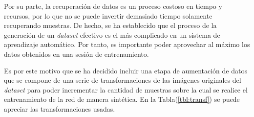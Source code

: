     Por su parte, la recuperación de datos es un proceso costoso en tiempo y recursos, por lo que no se puede invertir demasiado 
    tiempo solamente recuperando muestras. De hecho, se ha establecido que el proceso de la generación de un \textit{dataset} efectivo 
    es el más complicado en un sistema de aprendizaje automático. Por tanto, es importante poder aprovechar al máximo los datos 
    obtenidos en una sesión de entrenamiento.

    Es por este motivo que se ha decidido incluir una etapa de aumentación de datos que se compone de una serie de transformaciones 
    de las imágenes originales del \textit{dataset} para poder incrementar la cantidad de muestras sobre la cual se realice el 
    entrenamiento de la red de manera sintética. En la Tabla(\ref{tbl:transf}) se puede apreciar las transformaciones usadas.
    
    \begin{table}[!h]
        \centering
        \caption{Transformaciones realizadas en la aumentación de datos. Fuente: Elaboración propia.}
    \label{tbl:transf}
    \end{table}

